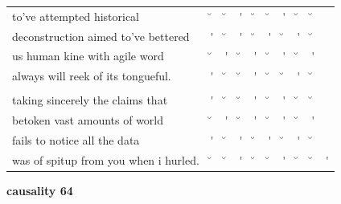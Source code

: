 \documentclass[12pt, landscape]{article}
\begin{document}
\begin{center}
\begin{tabularx}{\textwidth}{
>{\lefting\arraybackslash}X
c
c
c
c
c
c
c
c
c
}

to've attempted historical & \u{} & \u{} & \'{} & \u{} & \u{} & \'{} & \u{} & \u{} & \\
deconstruction aimed to've bettered & \'{} & \u{} & \'{} & \u{} & \'{} & \u{} & \'{} & \u{} & \\
us human kine with agile word & \u{} & \'{} & \u{} & \'{} & \u{} & \'{} & \u{} & \'{} & \\
always will reek of its tongueful. & \'{} & \u{} & \u{} & \'{} & \u{} & \u{} & \'{} & \u{} & \\
 & & & & & & & & \\
taking sincerely the claims that & \'{} & \u{} & \u{} & \'{} & \u{} & \'{} & \u{} & \u{} & \\
betoken vast amounts of world & \u{} & \'{} & \u{} & \'{} & \u{} & \'{} & \u{} & \'{} & \\
fails to notice all the data & \'{} & \u{} & \'{} & \u{} & \'{} & \u{} & \'{} & \u{} & \\
was of spitup from you when i hurled. & \u{} & \u{} & \'{} & \u{} & \u{} & \'{} & \u{} & \u{} & \'{} \\

\end{tabularx}
\end{center}

\vspace*{\fill}

\newpage

\vspace*{\fill}

\noindent \textbf{causality 64}
\noindent \hfill \par
\end{document}
